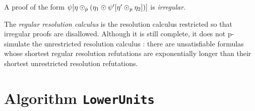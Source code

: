 \documentclass[envcountsame]{llncs}
\newcommand{\sm}[1]{\par\noindent{\sf SM: #1}\par\medskip}
\newcommand{\SM}[1]{\marginpar{\footnotesize{\sf SM: #1}}}
\newcommand{\sm}[1]{}
\newcommand{\SM}[1]{}
\newcommand{\LUlong}{\texttt{Lower\-Units}}
\begin{document}
\begin{definition}[Irregularity] \label{def:irregularity}
  A proof of the form
%
%
  $\psi[ \eta \odot_p (\eta_1 \odot \psi'[\eta' \odot_p \eta_2]) ]$
  is \emph{irregular}.
%
\hfill\QED
\end{definition}

The \emph{regular resolution calculus} is the resolution calculus restricted so that irregular proofs are disallowed. Although it is still complete, it does not p-simulate the unrestricted resolution calculus \cite{Tseitin1983On-The-Complexity-of-Proofs-in-Propositional-Logics}: there are unsatisfiable formulas whose shortest regular resolution refutations are exponentially longer than their shortest unrestricted resolution refutations.

%
%
%
%
%



\section{Algorithm {\LUlong}}
\end{document}
